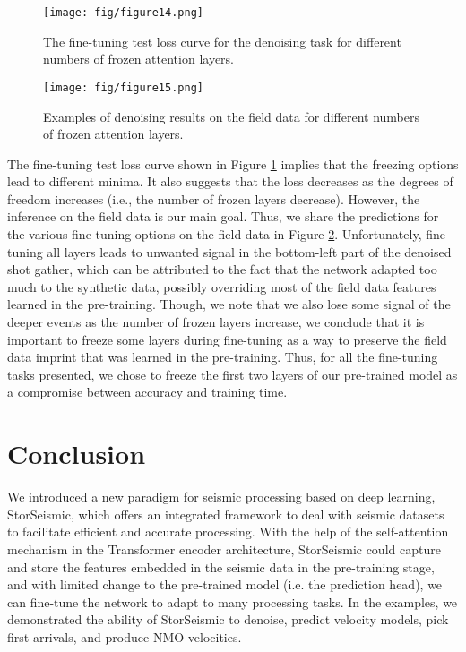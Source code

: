 \documentclass{article}
\begin{document}
\begin{figure}[!h]
    \centering
    \texttt{[image: fig/figure14.png]}
    \caption{The fine-tuning test loss curve for the denoising task for different numbers of frozen attention layers.}
    \label{fig:fig14}
\end{figure}

\begin{figure}[!h]
    \centering
    \texttt{[image: fig/figure15.png]}
    \caption{Examples of denoising results on the field data for different numbers of frozen attention layers.}
    \label{fig:fig15}
\end{figure}

The fine-tuning test loss curve shown in Figure \ref{fig:fig14} implies that the freezing options lead to different minima. It also suggests that the loss decreases as the degrees of freedom increases (i.e., the number of frozen layers decrease). However, the inference on the field data is our main goal. Thus, we share the predictions for the various fine-tuning options on the field data in Figure \ref{fig:fig15}. Unfortunately, fine-tuning all layers leads to unwanted signal in the bottom-left part of the denoised shot gather, which can be attributed to the fact that the network adapted too much to the synthetic data, possibly overriding most of the field data features learned in the pre-training. Though, we note that we also lose some signal of the deeper events as the number of frozen layers increase, we conclude that it is important to freeze some layers during fine-tuning as a way to preserve the field data imprint that was learned in the pre-training. Thus, for all the fine-tuning tasks presented, we chose to freeze the first two layers of our pre-trained model as a compromise between accuracy and training time.

\section{Conclusion}
\label{sec:conclusion}
We introduced a new paradigm for seismic processing based on deep learning, StorSeismic, which offers an integrated framework to deal with seismic datasets to facilitate efficient and accurate processing. With the help of the self-attention mechanism in the Transformer encoder architecture, StorSeismic could capture and store the features embedded in the seismic data in the pre-training stage, and with limited change to the pre-trained model (i.e. the prediction head), we can fine-tune the network to adapt to many processing tasks. In the examples, we demonstrated the ability of StorSeismic to denoise, predict velocity models, pick first arrivals, and produce NMO velocities.
\end{document}
